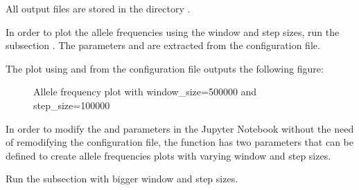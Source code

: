 \documentclass[letterpaper,10pt,english]{sphinxhowto}
\begin{document}
\sphinxAtStartPar
All output files are stored in the directory .

\sphinxAtStartPar
In order to plot the allele frequencies using the window and step sizes, run the subsection . The parameters  and  are extracted from the configuration file.

\begin{sphinxVerbatim}[commandchars=\\\{\}]
 \PYG{p}{[} \PYG{p}{]} 
\end{sphinxVerbatim}

\sphinxAtStartPar
The plot using  and  from the configuration file outputs the following figure:

\begin{figure}[htbp]
\centering
\capstart

\noindent{}
\caption{Allele frequency plot with window\_size=500000 and step\_size=100000}\label{\detokenize{index:id3}}\end{figure}

\sphinxAtStartPar
In order to modify the  and  parameters in the Jupyter Notebook without the need of remodifying the configuration file, the  function has two parameters that can be defined to create allele frequencies plots with varying window and step sizes.

\sphinxAtStartPar
Run the  subsection with bigger window and step sizes.

\begin{sphinxVerbatim}[commandchars=\\\{\}]
 \PYG{p}{[} \PYG{p}{]}     
\end{sphinxVerbatim}
\end{document}
